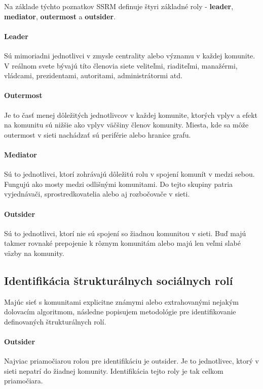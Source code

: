 \documentclass[slovak,master,public,dept460,male,cpdeclaration,oneside]{diploma}
\begin{document}
Na základe týchto poznatkov SSRM definuje štyri základné roly - \textbf{leader}, \textbf{mediator}, \textbf{outermost} a \textbf{outsider}.

\paragraph{Leader}
\hfill \break
Sú mimoriadni jednotlivci v zmysle centrality alebo významu v každej komunite. V reálnom svete bývajú títo členovia siete veliteľmi, riaditeľmi, manažérmi,  vládcami, prezidentami, autoritami, administrátormi atd.

\paragraph{Outermost}
\hfill \break
Je to časť menej dôležitých jednotlivcov v každej komunite, ktorých vplyv a efekt na komunitu sú nižšie ako vplyv väčšiny členov komunity. Miesta, kde sa môže outermost v sieti nachádzať sú periférie alebo hranice grafu.

\paragraph{Mediator}
\hfill \break
Sú to jednotlivci, ktorí zohrávajú dôležitú rolu v spojení komunít v medzi sebou. Fungujú ako mosty medzi odlišnými komunitami. Do tejto skupiny patria vyjednávači, sprostredkovatelia alebo aj rozbočovače v sieti. 

\paragraph{Outsider}
\hfill \break
Sú to jednotlivci, ktorí nie sú spojení so žiadnou komunitou v sieti. Buď majú takmer rovnaké prepojenie k rôznym komunitám alebo majú len veľmi slabé väzby na komunity.



\subsection{Identifikácia štrukturálnych sociálnych rolí} \label{identifikacia}
Majúc sieť s komunitami explicitne známymi alebo extrahovanými nejakým dolovacím algoritmom, následne popisujem metodológie pre identifikovanie definovaných štrukturálnych rolí.

\paragraph{Outsider}
\hfill \break
Najviac priamočiarou rolou pre identifikáciu je outsider. Je to jednotlivec, ktorý v sieti nepatrí do žiadnej komunity. Identifikácia tejto roly je tak celkom priamočiara.
\end{document}
